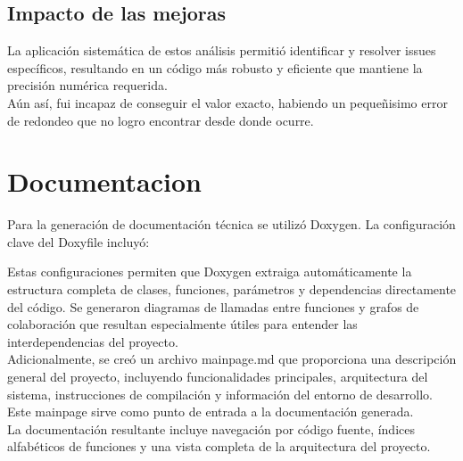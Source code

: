 \documentclass[12pt,a4paper]{article}
\begin{document}



\subsection{Impacto de las mejoras}

La aplicación sistemática de estos análisis permitió identificar y resolver issues específicos, resultando en un código más robusto y eficiente que mantiene la precisión numérica requerida.
\\
Aún así, fui incapaz de conseguir el valor exacto, habiendo un pequeñisimo error de redondeo que no logro encontrar desde donde ocurre.

\section{Documentacion}
Para la generación de documentación técnica se utilizó Doxygen.
La configuración clave del Doxyfile incluyó:


Estas configuraciones permiten que Doxygen extraiga automáticamente la estructura completa de clases, funciones, parámetros y dependencias directamente del código. Se generaron diagramas de llamadas entre funciones y grafos de colaboración que resultan especialmente útiles para entender las interdependencias del proyecto.
\\Adicionalmente, se creó un archivo mainpage.md que proporciona una descripción general del proyecto, incluyendo funcionalidades principales, arquitectura del sistema, instrucciones de compilación y información del entorno de desarrollo. Este mainpage sirve como punto de entrada a la documentación generada.
\\La documentación resultante incluye navegación por código fuente, índices alfabéticos de funciones y una vista completa de la arquitectura del proyecto.
\end{document}
